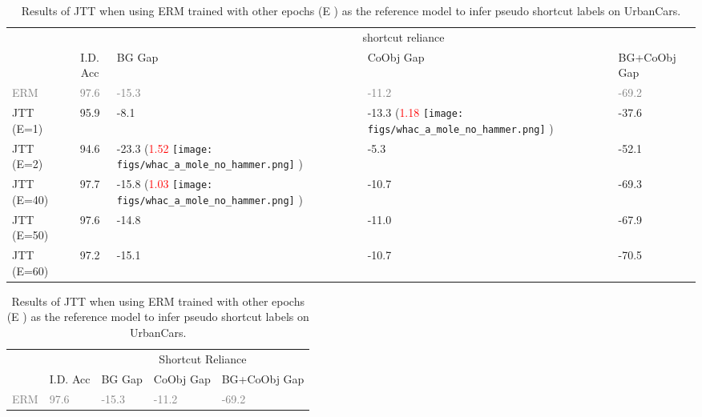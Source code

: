 \documentclass[10pt,twocolumn,letterpaper]{article}
\DeclareRobustCommand{\molenohammer}{\begingroup\normalfont
  \texttt{[image: figs/whac\_a\_mole\_no\_hammer.png]}\endgroup
}
\begin{document}
\begin{table}[t]
\parbox{.48\linewidth}{
\centering
\begin{adjustbox}{width=\linewidth}
\begin{tabular}{@{}lclll@{}}
\toprule
                    & \multicolumn{1}{c|}{}                    & \multicolumn{3}{c}{shortcut reliance}               \\ \cmidrule(l){3-5}
                    & \multicolumn{1}{c|}{I.D. Acc} & BG Gap      & CoObj Gap   & BG+CoObj Gap    \\ \midrule
\textcolor{gray}{ERM}      & \textcolor{gray}{97.6}    & \textcolor{gray}{-15.3}         & \textcolor{gray}{-11.2}         & \textcolor{gray}{-69.2}         \\ \midrule
JTT (E=1)           & 95.9                                   & -8.1          & -13.3 (\textcolor{red}{1.18} \molenohammer)        & -37.6         \\
JTT (E=2)           & 94.6                                   & -23.3  (\textcolor{red}{1.52} \molenohammer)       & -5.3          & -52.1         \\
JTT (E=40)           & 97.7                                   & -15.8  (\textcolor{red}{1.03} \molenohammer)        & -10.7        & -69.3         \\
JTT (E=50)           & 97.6                                   & -14.8       & -11.0          & -67.9         \\
JTT (E=60)           & 97.2                                   & -15.1         & -10.7          & -70.5         \\
\bottomrule
\end{tabular}
\end{adjustbox}
\caption{Results of JTT when using ERM trained with other epochs (E ) as the reference model to infer pseudo shortcut labels on UrbanCars.}
\label{appx:tab:jtt_urbancars_more_epochs}
}
\hfill
\parbox{.48\linewidth}{
\centering
\begin{adjustbox}{width=\linewidth}
\begin{tabular}{@{}lllll@{}}
\toprule
\multicolumn{1}{c}{} & \multicolumn{1}{c|}{}         & \multicolumn{3}{c}{Shortcut Reliance}         \\ \cmidrule(l){3-5}
                     & \multicolumn{1}{c|}{I.D. Acc} & BG Gap        & CoObj Gap     & BG+CoObj Gap  \\ \midrule
\textcolor{gray}{ERM}      & \textcolor{gray}{97.6}    & \textcolor{gray}{-15.3}         & \textcolor{gray}{-11.2}         & \textcolor{gray}{-69.2}         \\ \midrule

\end{tabular}
\end{adjustbox}}
\end{table}
\end{document}
